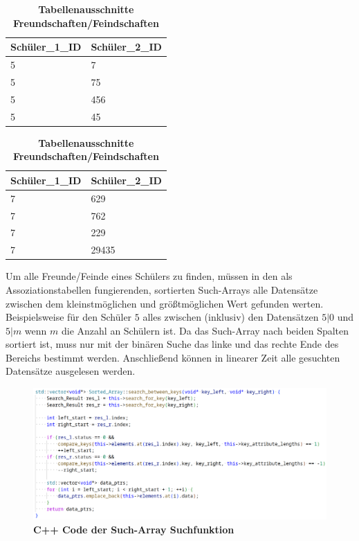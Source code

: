 \documentclass[11pt,a4paper]{article}
\begin{document}
\begin{table}[H]
    \centering
    \begin{tabular}{|l|l|}
        \hline
        Schüler\_1\_ID & Schüler\_2\_ID \\ \hline
        5              & 7              \\ \hline
        5              & 75             \\ \hline
        5              & 456            \\ \hline
        5              & 45             \\ \hline
    \end{tabular}
    \qquad
    \begin{tabular}{|l|l|}
        \hline
        Schüler\_1\_ID & Schüler\_2\_ID \\ \hline
        7              & 629            \\ \hline
        7              & 762            \\ \hline
        7              & 229            \\ \hline
        7              & 29435          \\ \hline
    \end{tabular}
    \caption{\textbf{Tabellenausschnitte Freundschaften/Feindschaften}}
\end{table}

Um alle Freunde/Feinde eines Schülers zu finden, müssen in
den als Assoziationstabellen fungierenden, sortierten Such-Arrays
alle Datensätze zwischen dem kleinstmöglichen und größtmöglichen Wert
gefunden werten. Beispielsweise für den Schüler $5$ alles zwischen (inklusiv) den Datensätzen
$5 | 0$ und $5 | m$ wenn $m$ die Anzahl an Schülern ist. Da das Such-Array
nach beiden Spalten sortiert ist, muss nur mit der binären Suche das linke
und das rechte Ende des Bereichs bestimmt werden. Anschließend können in linearer
Zeit alle gesuchten Datensätze ausgelesen werden.


\begin{figure}[H]
    \centering
    \includegraphics[width=1.1\textwidth]{./res/code_sort_array.png}
    \caption{\textbf{C++ Code der Such-Array Suchfunktion}}
\end{figure}
\end{document}
